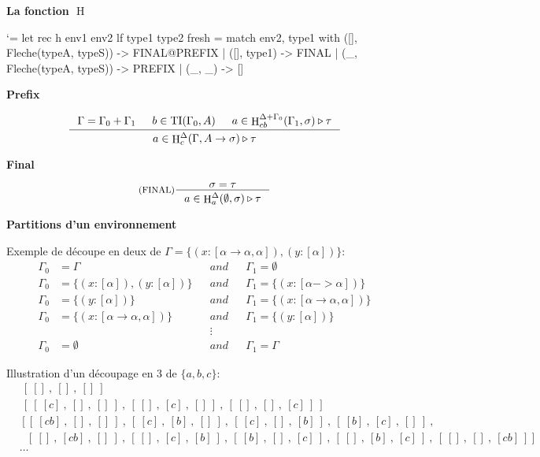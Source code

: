 \documentclass{beamer}
\newcommand\heading[1]{%
  \par\bigskip
  {\Large\bfseries#1}\par\smallskip}
\let\origlstlisting=\lstlisting
\let\endoriglstlisting=\endlstlisting
\renewenvironment{lstlisting}
{\mathcode`\-=\hyphenmathcode
    \everymath{}\mathsurround=0pt\origlstlisting}
{\endoriglstlisting}
\DeclareMathOperator{\iH}{H}
\DeclareMathOperator{\iTI}{TI}
\begin{document}
    
    \begin{frame}[containsverbatim]
        \heading{La fonction $\iH$}
        \begin{lstlisting}
let rec h env1 env2 lf type1 type2 fresh =
  match env2, type1 with
    ([], Fleche(typeA, typeS)) -> FINAL@PREFIX
    | ([], type1) -> FINAL
    | (_, Fleche(typeA, typeS)) -> PREFIX
    | (_, _) -> []
        \end{lstlisting}
        \heading{Prefix}
        \begin{displaymath}
        \inference[]{\Gamma = \Gamma_0 + \Gamma_1 & b \in \iTI(\Gamma_0, A) & a \in \iH^{\Delta + \Gamma_0}_{cb}(\Gamma_1, \sigma) \triangleright \tau}{a \in \iH^{\Delta}_c(\Gamma, A \rightarrow \sigma) \triangleright \tau}
        \end{displaymath}
        
        \heading{Final}
        \begin{displaymath}
        \inference[(FINAL)]{\sigma = \tau}{a \in \iH^{\Delta}_a(\emptyset, \sigma) \triangleright \tau}
        \end{displaymath}
    \end{frame}
    
    \begin{frame}
            \heading{Partitions d'un environnement}
            Exemple de découpe en deux de  $\Gamma = \{(x : [\alpha \rightarrow \alpha, \alpha]), (y : [\alpha])\}$:
            \begin{align*}
               \Gamma_0 &= \Gamma &&and&& \Gamma_1 = \emptyset
               \\\Gamma_0 &= \{(x:[\alpha]), (y:[\alpha])\} &&and&& \Gamma_1 = \{(x:[\alpha -> \alpha])\}
               \\\Gamma_0 &= \{(y:[\alpha])\} &&and&& \Gamma_1 = \{(x : [\alpha \rightarrow \alpha, \alpha])\}
               \\\Gamma_0 &= \{(x : [\alpha \rightarrow \alpha, \alpha])\} &&and&& \Gamma_1 = \{(y:[\alpha])\}
               \\&&&\vdots&&
               \\\Gamma_0 &= \emptyset &&and&& \Gamma_1 = \Gamma
            \end{align*}
            
            Illustration d'un découpage en 3 de $\{a,b,c\}$:
            \begin{align*}
                &\ [\ []\ ,\ []\ ,\ []\ ]\ &
                \\&\ [\ [\ [c]\ ,\ []\ ,\ []\ ]\ ,\ [\ []\ ,\ [c]\ ,\ []\ ]\ ,\ [\ []\ ,\ []\ ,\ [c]\ ]\ ]\ &
                \\&\ [\ [\ [cb]\ ,\ []\ ,\ []\ ]\ ,\ [\ [c]\ ,\ [b]\ ,\ []\ ]\ ,\ [\ [c]\ ,\ []\ ,\ [b]\ ]\ ,
                \ [\ [b]\ ,\ [c]\ ,\ []\ ]\ ,&
                \\&\ \ \ [\ []\ ,\ [cb]\ ,\ []\ ]\ ,\ [\ []\ ,\ [c]\ ,\ [b]\ ]\ ,
                \ [\ [b]\ ,\ []\ ,\ [c]\ ]\ ,\ [\ []\ ,\ [b]\ ,\ [c]\ ]\ ,\ [\ []\ ,\ []\ ,\ [cb]\ ]\  ]&
                \\&\ldots&
            \end{align*}
    \end{frame}
    
\end{document}
